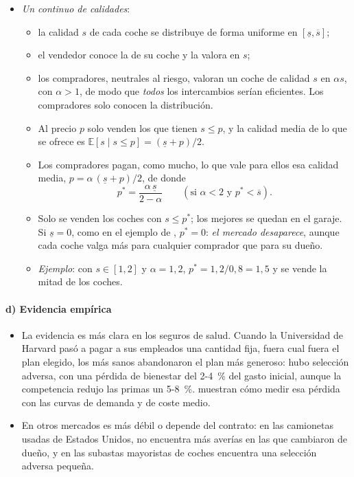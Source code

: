 \documentclass[11pt]{article}
\begin{document}
\begin{itemize}
\item \emph{Un continuo de calidades}:
  \begin{itemize}
  \item la calidad $s$ de cada coche se distribuye de forma uniforme en $[\underline{s},\overline{s}]$;
  \item el vendedor conoce la de su coche y la valora en $s$;
  \item los compradores, neutrales al riesgo, valoran un coche de calidad $s$ en $\alpha s$, con $\alpha>1$, de modo que \emph{todos} los intercambios serían eficientes. Los compradores solo conocen la distribución.
  \item Al precio $p$ solo venden los que tienen $s\leq p$, y la calidad media de lo que se ofrece es $\mathbb{E}[s\mid s\leq p]=(\underline{s}+p)/2$.
  \item Los compradores pagan, como mucho, lo que vale para ellos esa calidad media, $p=\alpha\,(\underline{s}+p)/2$, de donde
  \begin{equation}
  p^*=\frac{\alpha\,\underline{s}}{2-\alpha}\qquad(\text{si }\alpha<2\text{ y }p^*<\overline{s}). \label{eq:akerlof}
  \end{equation}
  \item Solo se venden los coches con $s\leq p^*$; los mejores se quedan en el garaje. Si $\underline{s}=0$, como en el ejemplo de \textcite{Akerlof1970Market}, $p^*=0$: \emph{el mercado desaparece}, aunque cada coche valga más para cualquier comprador que para su dueño.
  \item \emph{Ejemplo}: con $s\in[1,2]$ y $\alpha=1{,}2$, $p^*=1{,}2/0{,}8=1{,}5$ y se vende la mitad de los coches.
  \end{itemize}
\end{itemize}

\paragraph{d) Evidencia empírica}

\begin{itemize}
\item La evidencia es más clara en los seguros de salud. Cuando la Universidad de Harvard pasó a pagar a sus empleados una cantidad fija, fuera cual fuera el plan elegido, los más sanos abandonaron el plan más generoso: hubo selección adversa, con una pérdida de bienestar del 2-4~\% del gasto inicial, aunque la competencia redujo las primas un 5-8~\%\nocite{CutlerReber1998Paying}. \textcite{EinavFinkelstein2011Selection} muestran cómo medir esa pérdida con las curvas de demanda y de coste medio.
\item En otros mercados es más débil o depende del contrato: en las camionetas usadas de Estados Unidos, \textcite{Bond1982Direct} no encuentra más averías en las que cambiaron de dueño, y en las subastas mayoristas de coches \textcite{Genesove1993Adverse} encuentra una selección adversa pequeña.
\end{itemize}
\end{document}
